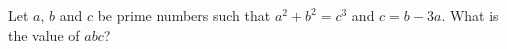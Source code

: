 Let $a$, $b$ and $c$ be prime numbers such that $a^2+b^2=c^3$ and $c=b-3a$. What is the value of $abc$?
